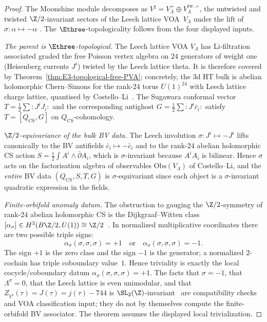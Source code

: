 \begin{proof}
The Moonshine module decomposes as
$V^\natural = V_\Lambda^+ \oplus V_\Lambda^{\mathrm{tw},+}$,
the untwisted and twisted $\Z/2$-invariant sectors of the
Leech lattice VOA~$V_\Lambda$ under the lift of
$\sigma\colon \alpha \mapsto -\alpha$
\cite{FLM88}. The $\Ethree$-topologicality follows from the
four displayed inputs.

\emph{The parent is $\Ethree$-topological.} The Leech
lattice VOA $V_\Lambda$ has Li-filtration associated graded
the free Poisson vertex algebra on $24$ generators of weight
one (Heisenberg currents $J^i$) twisted by the Leech lattice
theta. It is therefore covered by
Theorem~\ref{thm:E3-topological-free-PVA}; concretely, the
$3$d HT bulk is abelian holomorphic Chern--Simons for the
rank-$24$ torus $U(1)^{24}$ with Leech lattice charge lattice,
quantised by Costello--Li~\cite{CL16}. The Sugawara
conformal vector $T = \tfrac{1}{2}\sum {:}J^i J_i{:}$ and the
corresponding antighost $G = \tfrac{1}{2}\sum {:}J^i \bar c_i{:}$
satisfy $T = [Q_{\mathrm{CS}}, G]$ on $Q_{\mathrm{CS}}$-cohomology.

\emph{$\Z/2$-equivariance of the bulk BV data.}
The Leech involution $\sigma\colon J^i \mapsto -J^i$ lifts
canonically to the BV antifields $\bar c_i \mapsto -\bar c_i$
and to the rank-$24$ abelian holomorphic CS action
$S = \tfrac{1}{2}\int A^i \wedge \bar\partial A_i$, which is
$\sigma$-invariant because $A^i A_i$ is bilinear. Hence
$\sigma$ acts on the factorisation algebra of observables
$\mathrm{Obs}(V_\Lambda)$ of Costello--Li, and the
\emph{entire} BV data $(Q_{\mathrm{CS}}, S, T, G)$ is
$\sigma$-equivariant since each object is a $\sigma$-invariant
quadratic expression in the fields.

\emph{Finite-orbifold anomaly datum.} The obstruction to
gauging the $\Z/2$-symmetry of rank-$24$ abelian holomorphic CS is the
Dijkgraaf--Witten class
$[\alpha_\sigma] \in H^3(B\Z/2, U(1)) \cong \Z/2$~\cite{DW90}. In
normalized multiplicative coordinates there are two possible triple
signs:
\[
\alpha_\sigma(\sigma,\sigma,\sigma)=+1
\quad\text{or}\quad
\alpha_\sigma(\sigma,\sigma,\sigma)=-1.
\]
The sign \(+1\) is the zero class and the sign \(-1\) is the generator;
a normalized $2$-cochain has triple coboundary value~\(1\). Hence
triviality is exactly the local cocycle/coboundary datum
\(\alpha_\sigma(\sigma,\sigma,\sigma)=+1\). The facts that
\(\sigma=-1\), that \(\Lambda^\sigma=0\), that the Leech lattice is
even unimodular, and that
$Z_{V^\natural}(\tau)=J(\tau)=j(\tau)-744$ is
$\SL_2(\Z)$-invariant~\cite{Borcherds92} are compatibility checks and
VOA classification input; they do not by themselves compute the
finite-orbifold BV associator. The theorem assumes the displayed local
trivialization.


\end{proof}
